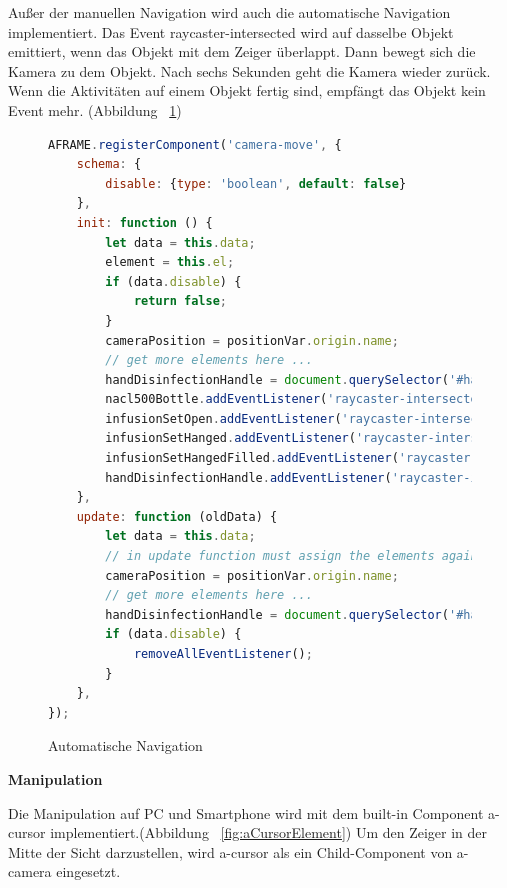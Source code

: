   Außer der manuellen Navigation wird auch die automatische Navigation implementiert. Das Event {\selectfont raycaster-intersected} wird auf dasselbe Objekt emittiert, wenn das Objekt mit dem Zeiger überlappt. Dann bewegt sich die Kamera zu dem Objekt. Nach sechs Sekunden geht die Kamera wieder zurück. Wenn die Aktivitäten auf einem Objekt fertig sind, empfängt das Objekt kein Event mehr. (Abbildung ~\ref{fig:cameraMove})
  
\begin{figure}[ht]
\vspace*{1em}
\centering
\caption[Automatische Navigation]{Automatische Navigation}
\begin{lstlisting}[language=JavaScript, style=htmlcssjs]
AFRAME.registerComponent('camera-move', {
    schema: {
        disable: {type: 'boolean', default: false}
    },
    init: function () {
        let data = this.data;
        element = this.el;
        if (data.disable) {
            return false;
        }
        cameraPosition = positionVar.origin.name;
        // get more elements here ...
        handDisinfectionHandle = document.querySelector('#handDisinfectionHandle');
        nacl500Bottle.addEventListener('raycaster-intersected', moveToCupboardAndBack);
        infusionSetOpen.addEventListener('raycaster-intersected', moveToCabinetAndBack);
        infusionSetHanged.addEventListener('raycaster-intersected', moveToHolderAndBack);
        infusionSetHangedFilled.addEventListener('raycaster-intersected', moveToHolderAndBack);
        handDisinfectionHandle.addEventListener('raycaster-intersected', moveToHandDisinfectionAndBack);
    },
    update: function (oldData) {
        let data = this.data;
        // in update function must assign the elements again
        cameraPosition = positionVar.origin.name;
        // get more elements here ...
        handDisinfectionHandle = document.querySelector('#handDisinfectionHandle');
        if (data.disable) {
            removeAllEventListener();
        }
    },
});

\end{lstlisting}
\label{fig:cameraMove} 
\end{figure}
  
  \vspace{1em}
  \noindent
  \textbf{Manipulation}
  \vspace{1em}
  
  \noindent
  Die Manipulation auf PC und Smartphone wird mit dem built-in Component {\selectfont a-cursor} implementiert.(Abbildung ~\ref{fig:aCursorElement}) Um den Zeiger in der Mitte der Sicht darzustellen, wird {\selectfont a-cursor} als ein Child-Component von {\selectfont a-camera} eingesetzt.
  
